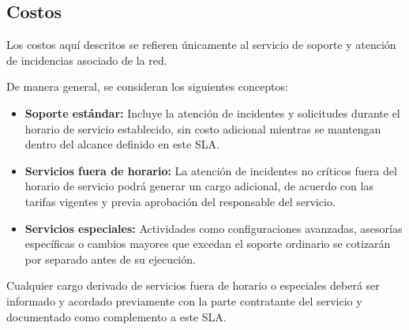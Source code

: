 \subsection{Costos}

Los costos aquí descritos se refieren únicamente al servicio de soporte y atención de incidencias asociado de la red.

De manera general, se consideran los siguientes conceptos:
\begin{itemize}
    \item \textbf{Soporte estándar:} Incluye la atención de incidentes y solicitudes durante el horario de servicio establecido, sin costo adicional mientras se mantengan dentro del alcance definido en este SLA.
    \item \textbf{Servicios fuera de horario:} La atención de incidentes no críticos fuera del horario de servicio podrá generar un cargo adicional, de acuerdo con las tarifas vigentes y previa aprobación del responsable del servicio.
    \item \textbf{Servicios especiales:} Actividades como configuraciones avanzadas, asesorías específicas o cambios mayores que excedan el soporte ordinario se cotizarán por separado antes de su ejecución.
\end{itemize}

Cualquier cargo derivado de servicios fuera de horario o especiales deberá ser informado y acordado previamente con la parte contratante del servicio y documentado como complemento a este SLA.
